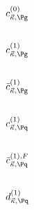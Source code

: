 \subsection{$c_{\vec\kappa,\Pg}^{(0)}$}


\subsection{$c_{\vec\kappa,\Pg}^{(1)}$} 


\subsection{$\bar c_{\vec\kappa,\Pg}^{(1)}$} \label{sec:Appendix:Partonic:cgBar1}


\subsection{$c_{\vec\kappa,\Pq}^{(1)}$}


\subsection{$\bar c_{\vec\kappa,\Pq}^{(1),F}$} \label{sec:Appendix:Partonic:cqBarF1}


\subsection{$d_{\vec\kappa,\Pq}^{(1)}$} \label{sec:Appendix:Partonic:dq1}

